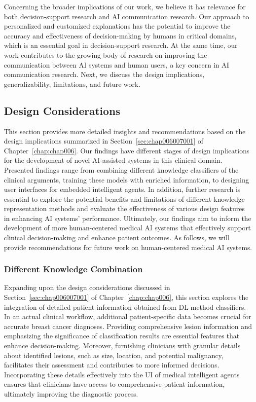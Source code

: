 Concerning the broader implications of our work, we believe it has relevance for both decision-support research and \ac{AI} communication research.
Our approach to personalized and customized explanations has the potential to improve the accuracy and effectiveness of decision-making by humans in critical domains, which is an essential goal in decision-support research.
At the same time, our work contributes to the growing body of research on improving the communication between \ac{AI} systems and human users, a key concern in \ac{AI} communication research.
\textcolor{revised}{Next, we discuss the design implications, generalizability, limitations, and future work.}

\subsection{Design Considerations}
\label{sec:app005008001}

This section provides more detailed insights and recommendations based on the design implications summarized in Section~\ref{sec:chap006007001} of Chapter~\ref{chap:chap006}.
Our findings have different stages of design implications for the development of novel \ac{AI}-assisted systems in this clinical domain.
\textcolor{revised}{Presented findings range from combining different knowledge classifiers of the clinical arguments, training these models with enriched information, to designing user interfaces for embedded intelligent agents.
In addition, further research is essential to explore the potential benefits and limitations of different knowledge representation methods and evaluate the effectiveness of various design features in enhancing \ac{AI} systems' performance.}
Ultimately, our findings aim to inform the development of more human-centered medical \ac{AI} systems that effectively support clinical decision-making and enhance patient outcomes.
\textcolor{revised}{As follows, we will provide recommendations for future work on human-centered medical \ac{AI} systems.}

\subsubsection{Different Knowledge Combination}
\label{sec:app005008001001}

\textcolor{revised}{Expanding upon the design considerations discussed in Section~\ref{sec:chap006007001} of Chapter~\ref{chap:chap006}, this section explores the integration of detailed patient information obtained from \ac{DL} method classifiers.
In an actual clinical workflow, additional patient-specific data becomes crucial for accurate breast cancer diagnoses.
Providing comprehensive lesion information and emphasizing the significance of classification results are essential features that enhance decision-making.
Moreover, furnishing clinicians with granular details about identified lesions, such as size, location, and potential malignancy, facilitates their assessment and contributes to more informed decisions.
Incorporating these details effectively into the \ac{UI} of medical intelligent agents ensures that clinicians have access to comprehensive patient information, ultimately improving the diagnostic process.}

